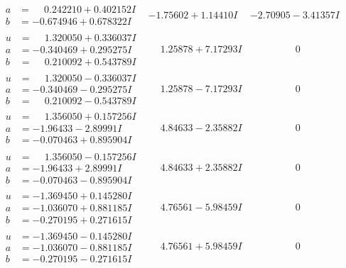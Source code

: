 \documentclass[1p]{elsarticle_modified}
\theoremstyle{definition}
\begin{document}
$$\begin{array}{c|c|c}
\begin{aligned}
a &= \phantom{-}0.242210 + 0.402152 I \\
b &= -0.674946 + 0.678322 I\end{aligned}
 & -1.75602 + 1.14410 I & -2.70905 - 3.41357 I \\ \hline\begin{aligned}
u &= \phantom{-}1.320050 + 0.336037 I \\
a &= -0.340469 + 0.295275 I \\
b &= \phantom{-}0.210092 + 0.543789 I\end{aligned}
 & \phantom{-}1.25878 + 7.17293 I & \phantom{-0.000000 } 0 \\ \hline\begin{aligned}
u &= \phantom{-}1.320050 - 0.336037 I \\
a &= -0.340469 - 0.295275 I \\
b &= \phantom{-}0.210092 - 0.543789 I\end{aligned}
 & \phantom{-}1.25878 - 7.17293 I & \phantom{-0.000000 } 0 \\ \hline\begin{aligned}
u &= \phantom{-}1.356050 + 0.157256 I \\
a &= -1.96433 - 2.89991 I \\
b &= -0.070463 + 0.895904 I\end{aligned}
 & \phantom{-}4.84633 - 2.35882 I & \phantom{-0.000000 } 0 \\ \hline\begin{aligned}
u &= \phantom{-}1.356050 - 0.157256 I \\
a &= -1.96433 + 2.89991 I \\
b &= -0.070463 - 0.895904 I\end{aligned}
 & \phantom{-}4.84633 + 2.35882 I & \phantom{-0.000000 } 0 \\ \hline\begin{aligned}
u &= -1.369450 + 0.145280 I \\
a &= -1.036070 + 0.881185 I \\
b &= -0.270195 + 0.271615 I\end{aligned}
 & \phantom{-}4.76561 - 5.98459 I & \phantom{-0.000000 } 0 \\ \hline\begin{aligned}
u &= -1.369450 - 0.145280 I \\
a &= -1.036070 - 0.881185 I \\
b &= -0.270195 - 0.271615 I\end{aligned}
 & \phantom{-}4.76561 + 5.98459 I & \phantom{-0.000000 } 0 \\ \hline\begin{aligned}

\end{aligned}
\end{array}$$
\end{document}

